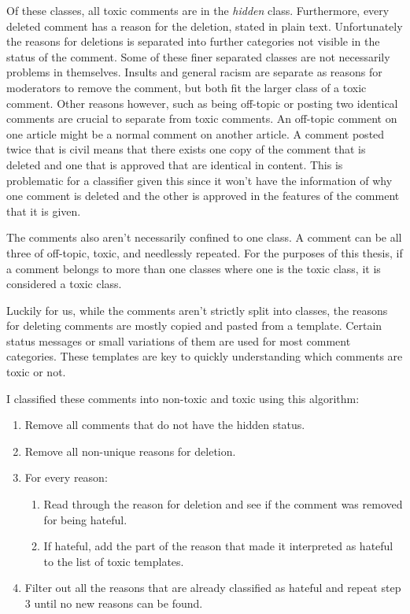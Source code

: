 \documentclass[nofilelist]{cslthse-msc}
\begin{document}
Of these classes, all toxic comments are in the \emph{hidden} class. Furthermore, every deleted comment has a reason for the deletion, stated in plain text. Unfortunately the reasons for deletions is separated into further categories not visible in the status of the comment. Some of these finer separated classes are not necessarily problems in themselves. Insults and general racism are separate as reasons for moderators to remove the comment, but both fit the larger class of a toxic comment. Other reasons however, such as being off-topic or posting two identical comments are crucial to separate from toxic comments. An off-topic comment on one article might be a normal comment on another article. A comment posted twice that is civil means that there exists one copy of the comment that is deleted and one that is approved that are identical in content. This is problematic for a classifier given this since it won't have the information of why one comment is deleted and the other is approved in the features of the comment that it is given.

The comments also aren't necessarily confined to one class. A comment can be all three of off-topic, toxic, and needlessly repeated. For the purposes of this thesis, if a comment belongs to more than one classes where one is the toxic class, it is considered a toxic class.

Luckily for us, while the comments aren't strictly split into classes, the reasons for deleting comments are mostly copied and pasted from a template. Certain status messages or small variations of them are used for most comment categories. These templates are key to quickly understanding which comments are toxic or not.

I classified these comments into non-toxic and toxic using this algorithm:

\begin{enumerate}
    \item Remove all comments that do not have the hidden status.
    \item Remove all non-unique reasons for deletion.
    \item For every reason:
     \begin{enumerate}
         \item Read through the reason for deletion and see if the comment was removed for being hateful.
         
         \item If hateful, add the part of the reason that made it interpreted as hateful to the list of toxic templates.
     \end{enumerate}
    \item Filter out all the reasons that are already classified as hateful and repeat step 3 until no new reasons can be found.
\end{enumerate}
\end{document}
